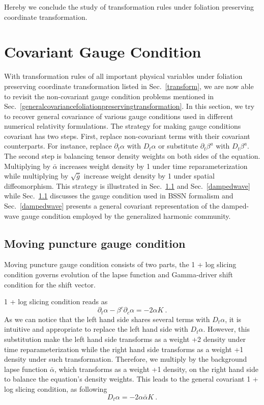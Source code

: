 Hereby we conclude the study of transformation rules under foliation preserving coordinate transformation. 

\section{Covariant Gauge Condition}\label{gauge}
With transformation rules of all important physical variables under foliation preserving coordinate transformation listed in Sec.~\ref{transform}, we are now able to revisit the non-covariant gauge condition problems mentioned in Sec.~\ref{generalcovariancefoliationpreservingtransformation}. In this section, we try to recover general covariance of various gauge conditions used in different numerical relativity formulations. The strategy for making gauge conditions covariant has two steps. First, replace non-covariant terms with their covariant counterparts. For instance, replace $\partial_{t}\alpha$ with $D_{t}\alpha$ or substitute $\partial_{t}\beta^{a}$ with $D_{t}\beta^{a}$. The second step is balancing tensor density weights on both sides of the equation. Multiplying by ${\bar \alpha}$ increases weight density by 1 under time reparameterization while multiplying by $\sqrt{{\bar g}}$ increase weight density by 1 under spatial diffeomorphism. This strategy is illustrated in Sec.~\ref{movingpuncture} and Sec.~\ref{dampedwave} while Sec.~\ref{movingpuncture} discusses the gauge condition used in BSSN formalism and Sec.~\ref{dampedwave} presents a general covariant representation of the damped-wave gauge condition\cite{Pretorius:2006tp, Szilagyi:2009qz, Lindblom:2009tu} employed by the generalized harmonic community. 
\subsection{Moving puncture gauge condition}\label{movingpuncture}
Moving puncture gauge condition consists of two parts, the 1 + log slicing condition governs evolution of the lapse function and Gamma-driver shift condition for the shift vector. 

1 + log slicing condition reads as
\begin{equation}\label{1 + log slicing}
\partial_{t}\alpha - \beta^{c}\partial_{c}\alpha = -2\alpha K \ .
\end{equation}
As we can notice that the left hand side shares several terms with $D_{t}\alpha$, it is intuitive and appropriate to replace the left hand side with $D_{t}\alpha$. However, this substitution make the left hand side transforms as a weight +2 density under time reparameterization while the right hand side transforms as a weight +1 density under such transformation. Therefore, we multiply by the background lapse function ${\bar \alpha}$, which transforms as a weight +1 density, on the right hand side to balance the equation's density weights. This leads to the general covariant 1 + log slicing condition, as following
\begin{equation}\label{covariant 1 + log slicing}
D_{t}\alpha = -2\alpha{\bar \alpha}K \ .
\end{equation}

